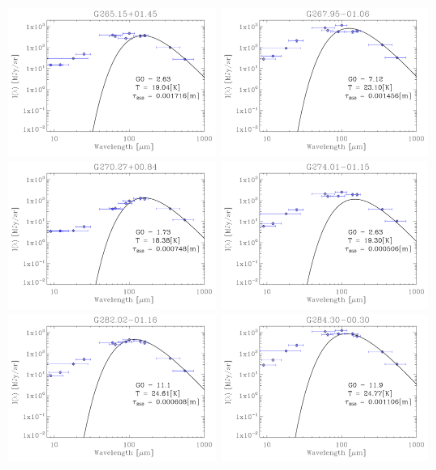 \begin{figure}
\includegraphics[trim=-1mm -1mm -1mm -1mm, clip, width=55mm]{appB/appB_66.pdf}
\includegraphics[trim=-1mm -1mm -1mm -1mm, clip, width=55mm]{appB/appB_67.pdf}
\includegraphics[trim=-1mm -1mm -1mm -1mm, clip, width=55mm]{appB/appB_68.pdf}
\includegraphics[trim=-1mm -1mm -1mm -1mm, clip, width=55mm]{appB/appB_69.pdf}
\includegraphics[trim=-1mm -1mm -1mm -1mm, clip, width=55mm]{appB/appB_70.pdf}
\includegraphics[trim=-1mm -1mm -1mm -1mm, clip, width=55mm]{appB/appB_71.pdf}
\end{figure}

